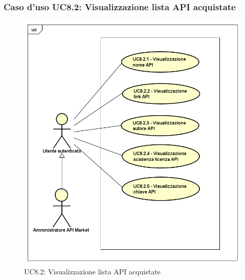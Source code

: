 \newpage
\subsubsection{Caso d'uso UC8.2: Visualizzazione lista API acquistate}
\label{UC8_2}
\begin{figure}[ht]
	\centering
	\includegraphics[scale=0.45]{UML/UC8_2.png}
	\caption{UC8.2: Visualizzazione lista API acquistate}
\end{figure}

